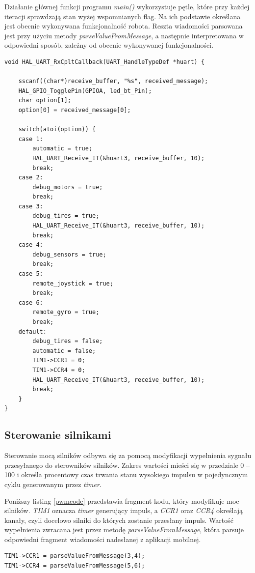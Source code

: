 Działanie głównej funkcji programu \textit{main()} wykorzystuje pętle, które przy każdej iteracji sprawdzają stan wyżej wspomnianych flag. Na ich podstawie określana jest obecnie wykonywana funkcjonalność robota. Reszta wiadomości parsowana jest przy użyciu metody \textit{parseValueFromMessage}, a następnie interpretowana w odpowiedni sposób, zależny od obecnie wykonywanej funkcjonalności.

\begin{minipage}{\textwidth}
	\begin{lstlisting}[label=interruptcode,caption=Funkcja obsługująca przerwanie.]
void HAL_UART_RxCpltCallback(UART_HandleTypeDef *huart) {

	sscanf((char*)receive_buffer, "%s", received_message);
	HAL_GPIO_TogglePin(GPIOA, led_bt_Pin);
	char option[1];
	option[0] = received_message[0];

	switch(atoi(option)) {
	case 1:
		automatic = true;
		HAL_UART_Receive_IT(&huart3, receive_buffer, 10);
		break;
	case 2:
		debug_motors = true;
		break;
	case 3:
		debug_tires = true;
		HAL_UART_Receive_IT(&huart3, receive_buffer, 10);
		break;
	case 4:
		debug_sensors = true;
		break;
	case 5:
		remote_joystick = true;
		break;
	case 6:
		remote_gyro = true;
		break;
	default:
		debug_tires = false;
		automatic = false;
		TIM1->CCR1 = 0;
		TIM1->CCR4 = 0;
		HAL_UART_Receive_IT(&huart3, receive_buffer, 10);
	    break;
	}
}
	\end{lstlisting}
\end{minipage}
 
\subsection{Sterowanie silnikami}
Sterowanie mocą silników odbywa się za pomocą modyfikacji wypełnienia sygnału przesyłanego do sterowników silników. Zakres wartości mieści się w przedziale 0 – 100 i określa procentowy czas trwania stanu wysokiego impulsu w pojedyncznym cyklu generowanym przez \textit{timer}. 

Poniższy listing \ref{pwmcode} przedstawia fragment kodu, który modyfikuje moc silników. \textit{TIM1} oznacza \textit{timer} generujący impuls, a \textit{CCR1} oraz \textit{CCR4} określają kanały, czyli docelowo silniki do których zostanie przesłany impuls.  Wartość wypełnienia zwracana jest przez metodę \textit{parseValueFromMessage}, która parsuje odpowiedni fragment wiadomości nadesłanej z aplikacji mobilnej. 

\begin{minipage}{\textwidth}
	\begin{lstlisting}[label=pwmcode,caption=Sterowanie mocą silników.]
TIM1->CCR1 = parseValueFromMessage(3,4);
TIM1->CCR4 = parseValueFromMessage(5,6);
	\end{lstlisting}
\end{minipage}

